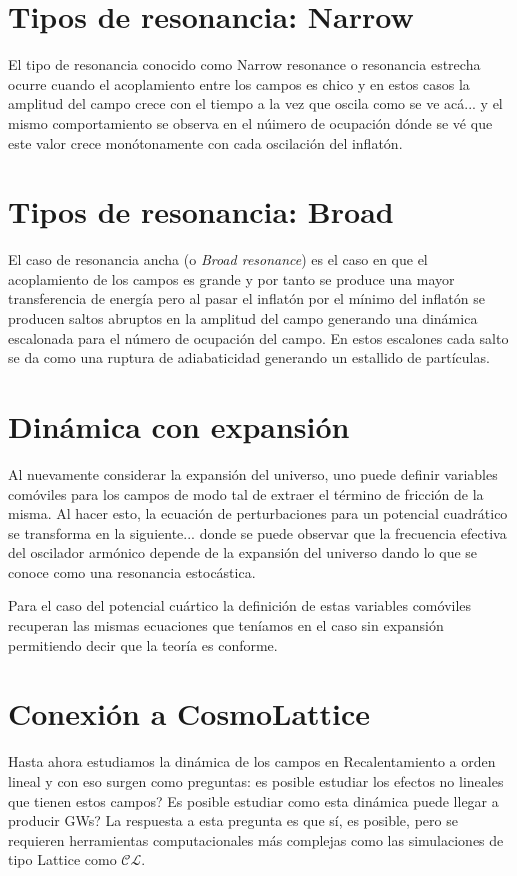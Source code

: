 \documentclass[letterpaper,12pt]{report}
\newcommand{\CosmoLattice}{\ensuremath{\mathcal{C}}\text{osmo}\ensuremath{\mathcal{L}}\text{attice}\xspace}
\begin{document}
  \section{Tipos de resonancia: Narrow}
    El tipo de resonancia conocido como Narrow resonance o resonancia estrecha ocurre cuando el acoplamiento entre los campos es chico y en estos casos la amplitud del campo crece con el tiempo a la vez que oscila como se ve acá... y el mismo comportamiento se observa en el núimero de ocupación dónde se vé que este valor crece monótonamente con cada oscilación del inflatón.

  \section{Tipos de resonancia: Broad}
    El caso de resonancia ancha (o \textit{Broad resonance}) es el caso en que el acoplamiento de los campos es grande y por tanto se produce una mayor transferencia de energía pero al pasar el inflatón por el mínimo del inflatón se producen saltos abruptos en la amplitud del campo generando una dinámica escalonada para el número de ocupación del campo. En estos escalones cada salto se da como una ruptura de adiabaticidad generando un estallido de partículas.

  \section{Dinámica con expansión}
    Al nuevamente considerar la expansión del universo, uno puede definir variables comóviles para los campos de modo tal de extraer el término de fricción de la misma. Al hacer esto, la ecuación de perturbaciones para un potencial cuadrático se transforma en la siguiente... donde se puede observar que la frecuencia efectiva del oscilador armónico depende de la expansión del universo dando lo que se conoce como una resonancia estocástica.
    
    Para el caso del potencial cuártico la definición de estas variables comóviles recuperan las mismas ecuaciones que teníamos en el caso sin expansión permitiendo decir que la teoría es conforme.
    
    \section{Conexión a CosmoLattice}
      Hasta ahora estudiamos la dinámica de los campos en Recalentamiento a orden lineal y con eso surgen como preguntas: es posible estudiar los efectos no lineales que tienen estos campos? Es posible estudiar como esta dinámica puede llegar a producir GWs? La respuesta a esta pregunta es que sí, es posible, pero se requieren herramientas computacionales más complejas como las simulaciones de tipo Lattice como \CosmoLattice.
\end{document}
